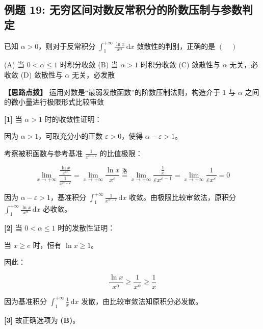 \documentclass[11pt,a4paper,UTF8]{ctexart}
\begin{document}
\subsection{例题 19: 无穷区间对数反常积分的阶数压制与参数判定}

已知 $\alpha > 0$，则对于反常积分 $\int_1^{+\infty} \frac{\ln x}{x^\alpha}\,\mathrm{d}x$ 敛散性的判别，正确的是 $(\quad)$

(A) 当 $0 < \alpha \leqslant 1$ 时积分收敛
(B) 当 $\alpha > 1$ 时积分收敛
(C) 敛散性与 $\alpha$ 无关，必收敛
(D) 敛散性与 $\alpha$ 无关，必发散

\textbf{\color{DeepPurple}【思路点拨】} 运用对数是“最弱发散函数”的阶数压制法则，构造介于 $1$ 与 $\alpha$ 之间的微小量进行极限形式比较审敛


\begin{solbox}[分步推导与答题规范]
\textbf{[1]} 当 $\alpha > 1$ 时的收敛性证明：

因为 $\alpha > 1$，可取充分小的正数 $\varepsilon > 0$，使得 $\alpha - \varepsilon > 1$。

考察被积函数与参考基准 $\frac{1}{x^{\alpha-\varepsilon}}$ 的比值极限：


\begin{equation*}
\lim_{x \to +\infty} \frac{\frac{\ln x}{x^\alpha}}{\frac{1}{x^{\alpha-\varepsilon}}} = \lim_{x \to +\infty} \frac{\ln x}{x^\varepsilon} \stackrel{\text{洛}}{=} \lim_{x \to +\infty} \frac{\frac{1}{x}}{\varepsilon x^{\varepsilon-1}} = \lim_{x \to +\infty} \frac{1}{\varepsilon x^\varepsilon} = 0
\end{equation*}


因为 $\alpha - \varepsilon > 1$，基准积分 $\int_1^{+\infty} \frac{1}{x^{\alpha-\varepsilon}}\,\mathrm{d}x$ 收敛。由极限比较审敛法，原积分 $\int_1^{+\infty} \frac{\ln x}{x^\alpha}\,\mathrm{d}x$ 必收敛。

\textbf{[2]} 当 $0 < \alpha \leqslant 1$ 时的发散性证明：

当 $x \geqslant e$ 时，恒有 $\ln x \geqslant 1$。

因此：


\begin{equation*}
\frac{\ln x}{x^\alpha} \geqslant \frac{1}{x^\alpha} \geqslant \frac{1}{x}
\end{equation*}


因为基准积分 $\int_1^{+\infty} \frac{1}{x}\,\mathrm{d}x$ 发散，由比较审敛法知原积分必发散。

\textbf{[3]} 故正确选项为 \textbf{(B)}。
\end{solbox}
\end{document}
